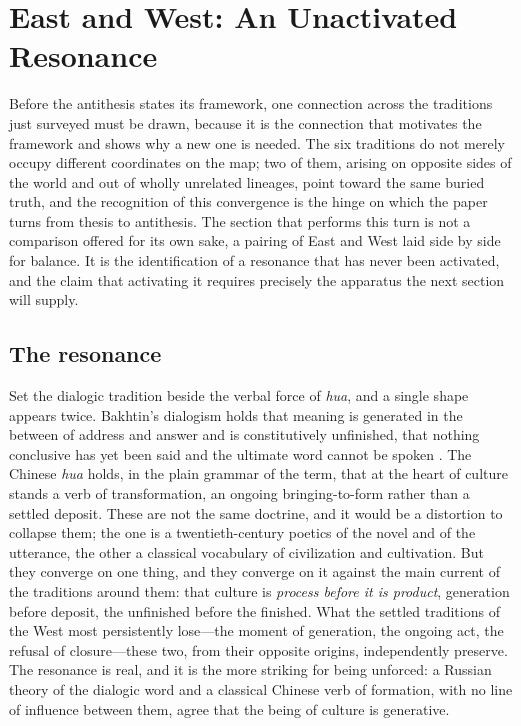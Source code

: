 \section{East and West: An Unactivated Resonance}
\label{p24:sec:eastwest}

\noindent
Before the antithesis states its framework, one connection across the traditions just surveyed must be drawn, because it is the connection that motivates the framework and shows why a new one is needed. The six traditions do not merely occupy different coordinates on the map; two of them, arising on opposite sides of the world and out of wholly unrelated lineages, point toward the same buried truth, and the recognition of this convergence is the hinge on which the paper turns from thesis to antithesis. The section that performs this turn is not a comparison offered for its own sake, a pairing of East and West laid side by side for balance. It is the identification of a resonance that has never been activated, and the claim that activating it requires precisely the apparatus the next section will supply.

\subsection*{The resonance}

Set the dialogic tradition beside the verbal force of \emph{hua}, and a single shape appears twice. Bakhtin's dialogism holds that meaning is generated in the between of address and answer and is constitutively unfinished, that nothing conclusive has yet been said and the ultimate word cannot be spoken \parencite{bakhtin1984poetics}. The Chinese \emph{hua} holds, in the plain grammar of the term, that at the heart of culture stands a verb of transformation, an ongoing bringing-to-form rather than a settled deposit. These are not the same doctrine, and it would be a distortion to collapse them; the one is a twentieth-century poetics of the novel and of the utterance, the other a classical vocabulary of civilization and cultivation. But they converge on one thing, and they converge on it against the main current of the traditions around them: that culture is \emph{process before it is product}, generation before deposit, the unfinished before the finished. What the settled traditions of the West most persistently lose---the moment of generation, the ongoing act, the refusal of closure---these two, from their opposite origins, independently preserve. The resonance is real, and it is the more striking for being unforced: a Russian theory of the dialogic word and a classical Chinese verb of formation, with no line of influence between them, agree that the being of culture is generative.

